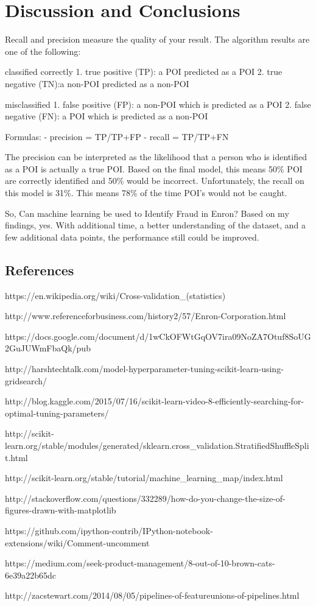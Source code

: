 \documentclass{article}
\begin{document}
    \section{Discussion and Conclusions}\label{discussion-and-conclusions}

    Recall and precision measure the quality of your result. The algorithm
results are one of the following:

classified correctly 1. true positive (TP): a POI predicted as a POI 2.
true negative (TN):a non-POI predicted as a non-POI

misclassified 1. false positive (FP): a non-POI which is predicted as a
POI 2. false negative (FN): a POI which is predicted as a non-POI

Formulas: - precision = TP/TP+FP - recall = TP/TP+FN

The precision can be interpreted as the likelihood that a person who is
identified as a POI is actually a true POI. Based on the final model,
this means 50\% POI are correctly identified and 50\% would be
incorrect. Unfortunately, the recall on this model is 31\%. This means
78\% of the time POI's would not be caught.

So, Can machine learning be used to Identify Fraud in Enron? Based on my
findings, yes. With additional time, a better understanding of the
dataset, and a few additional data points, the performance still could
be improved.

    \subsection{References}\label{references}

    https://en.wikipedia.org/wiki/Cross-validation\_(statistics)

http://www.referenceforbusiness.com/history2/57/Enron-Corporation.html

https://docs.google.com/document/d/1wCkOFWtGqOV7ira09NoZA7Otuf8SoUG2GuJUWmFbaQk/pub

http://harshtechtalk.com/model-hyperparameter-tuning-scikit-learn-using-gridsearch/

http://blog.kaggle.com/2015/07/16/scikit-learn-video-8-efficiently-searching-for-optimal-tuning-parameters/

http://scikit-learn.org/stable/modules/generated/sklearn.cross\_validation.StratifiedShuffleSplit.html

http://scikit-learn.org/stable/tutorial/machine\_learning\_map/index.html

http://stackoverflow.com/questions/332289/how-do-you-change-the-size-of-figures-drawn-with-matplotlib

https://github.com/ipython-contrib/IPython-notebook-extensions/wiki/Comment-uncomment

https://medium.com/seek-product-management/8-out-of-10-brown-cats-6e39a22b65dc

http://zacstewart.com/2014/08/05/pipelines-of-featureunions-of-pipelines.html


    
    
    
    
\end{document}
